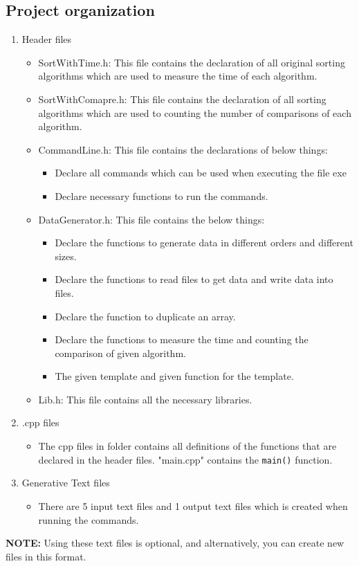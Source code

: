 \subsection{Project organization}
\begin{enumerate}
    \item Header files
    \begin{itemize}[label=-]
        \item SortWithTime.h: This file contains the declaration of all original sorting algorithms which are used to measure the time of each algorithm.
        \item SortWithComapre.h: This file contains the declaration of all sorting algorithms which are used to counting the number of comparisons of each algorithm.
        \item CommandLine.h: This file contains the declarations of below things:
        \begin{itemize}
            \item Declare all commands  which can be used when executing the file exe
            \item Declare necessary functions to run the commands.
        \end{itemize}

        \item DataGenerator.h: This file contains the below things:
        \begin{itemize}
            \item Declare the functions to generate data in different orders and different sizes.
            \item Declare the functions to read files to get data and write data into files.
            \item Declare the function to duplicate an array.
            \item Declare the functions to measure the time and counting the comparison of given algorithm.
            \item The given template and given function for the template.
        \end{itemize}
        \item Lib.h: This file contains all the necessary libraries.
    \end{itemize}
    \item .cpp files
    \begin{itemize}[label=-]
        \item The cpp files in folder contains all definitions of the functions that are declared in the header files. "main.cpp" contains the \texttt{main()} function.
    \end{itemize}
    \item Generative Text files
    \begin{itemize}[label=-]
        \item There are 5 input text files and 1 output text files which is created when running the commands. 
    \end{itemize}
\end{enumerate}
\textbf{NOTE:} Using these text files is optional, and alternatively, you can create new files in this format.
